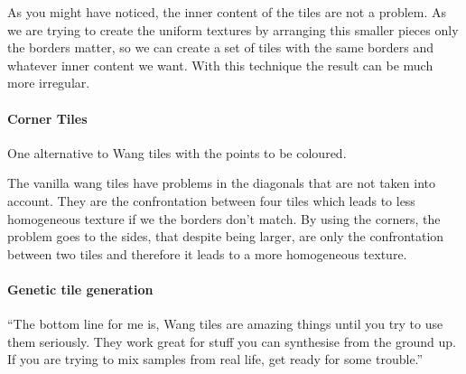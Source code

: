 As you might have noticed, the inner content of the tiles are not a problem. As we are trying to create the uniform textures by arranging this smaller pieces only the borders matter, so we can create a set of tiles with the same borders and whatever inner content we want. With this technique the result can be much more irregular. 



\paragraph{Corner Tiles \cite{LD06AWTCECC}} %
 \label{par:corner_tiles}
One alternative to Wang tiles with the points to be coloured.

The vanilla wang tiles have problems in the diagonals that are not taken into account. They are the confrontation between four tiles which leads to less homogeneous texture if we the borders don't match. By using the corners, the problem goes to the sides, that despite being larger, are only the confrontation between two tiles and therefore it leads to a more homogeneous texture.


\paragraph{Genetic tile generation} %
\label{par:genetic_tile_generation}
“The bottom line for me is, Wang tiles are amazing things until you try to use them seriously. They work great for stuff you can synthesise from the ground up. If you are trying to mix samples from real life, get ready for some trouble.” \cite{ProcWorld}




